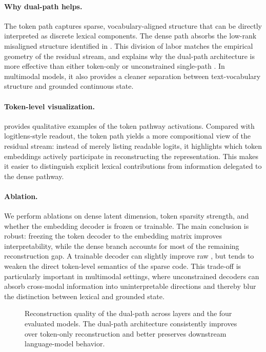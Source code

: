 \documentclass{article}
\begin{document}
\paragraph{Why dual-path helps.}
The token path captures sparse, vocabulary-aligned structure that can be directly interpreted as discrete lexical components.
The dense path absorbs the low-rank misaligned structure identified in .
This division of labor matches the empirical geometry of the residual stream, and explains why the dual-path architecture is more effective than either token-only or unconstrained single-path . In multimodal models, it also provides a cleaner separation between text-vocabulary structure and grounded continuous state.

\paragraph{Token-level visualization.}
 provides qualitative examples of the token pathway activations.
Compared with \gls{logitlens}-style readout, the token path yields a more compositional view of the residual stream: instead of merely listing readable logits, it highlights which token embeddings actively participate in reconstructing the representation.
This makes it easier to distinguish explicit lexical contributions from information delegated to the dense pathway.

\paragraph{Ablation.}
We perform ablations on dense latent dimension, token sparsity strength, and whether the embedding decoder is frozen or trainable.
The main conclusion is robust:
freezing the token decoder to the embedding matrix improves interpretability,
while the dense branch accounts for most of the remaining reconstruction gap.
A trainable decoder can slightly improve raw , but tends to weaken the direct token-level semantics of the sparse code.
This trade-off is particularly important in multimodal settings, where unconstrained decoders can absorb cross-modal information into uninterpretable directions and thereby blur the distinction between lexical and grounded state.

\begin{figure}[t]
  \centering
  \caption{
    Reconstruction quality of the dual-path  across layers and the four evaluated models.
    The dual-path architecture consistently improves over token-only reconstruction and better preserves downstream language-model behavior.
  }
  \label{fig:dualpath_recovery}
\end{figure}
\end{document}
